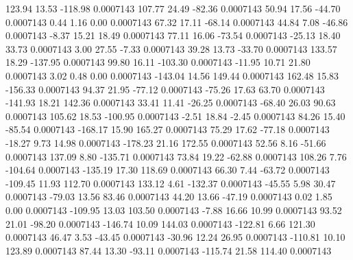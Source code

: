       123.94       13.53     -118.98     0.0007143
      107.77       24.49      -82.36     0.0007143
       50.94       17.56      -44.70     0.0007143
        0.44        1.16        0.00     0.0007143
       67.32       17.11      -68.14     0.0007143
       44.84        7.08      -46.86     0.0007143
       -8.37       15.21       18.49     0.0007143
       77.11       16.06      -73.54     0.0007143
      -25.13       18.40       33.73     0.0007143
        3.00       27.55       -7.33     0.0007143
       39.28       13.73      -33.70     0.0007143
      133.57       18.29     -137.95     0.0007143
       99.80       16.11     -103.30     0.0007143
      -11.95       10.71       21.80     0.0007143
        3.02        0.48        0.00     0.0007143
     -143.04       14.56      149.44     0.0007143
      162.48       15.83     -156.33     0.0007143
       94.37       21.95      -77.12     0.0007143
      -75.26       17.63       63.70     0.0007143
     -141.93       18.21      142.36     0.0007143
       33.41       11.41      -26.25     0.0007143
      -68.40       26.03       90.63     0.0007143
      105.62       18.53     -100.95     0.0007143
       -2.51       18.84       -2.45     0.0007143
       84.26       15.40      -85.54     0.0007143
     -168.17       15.90      165.27     0.0007143
       75.29       17.62      -77.18     0.0007143
      -18.27        9.73       14.98     0.0007143
     -178.23       21.16      172.55     0.0007143
       52.56        8.16      -51.66     0.0007143
      137.09        8.80     -135.71     0.0007143
       73.84       19.22      -62.88     0.0007143
      108.26        7.76     -104.64     0.0007143
     -135.19       17.30      118.69     0.0007143
       66.30        7.44      -63.72     0.0007143
     -109.45       11.93      112.70     0.0007143
      133.12        4.61     -132.37     0.0007143
      -45.55        5.98       30.47     0.0007143
      -79.03       13.56       83.46     0.0007143
       44.20       13.66      -47.19     0.0007143
        0.02        1.85        0.00     0.0007143
     -109.95       13.03      103.50     0.0007143
       -7.88       16.66       10.99     0.0007143
       93.52       21.01      -98.20     0.0007143
     -146.74       10.09      144.03     0.0007143
     -122.81        6.66      121.30     0.0007143
       46.47        3.53      -43.45     0.0007143
      -30.96       12.24       26.95     0.0007143
     -110.81       10.10      123.89     0.0007143
       87.44       13.30      -93.11     0.0007143
     -115.74       21.58      114.40     0.0007143
